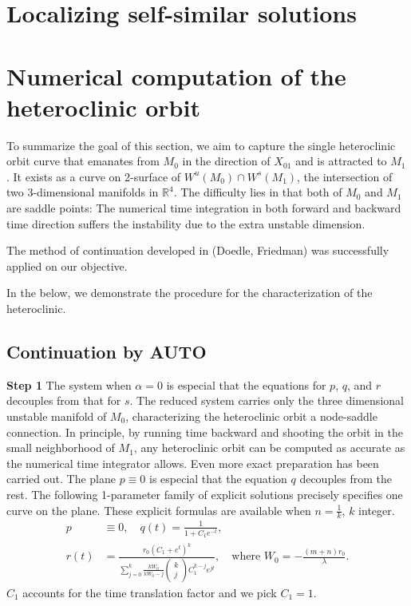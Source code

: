 \documentclass[a4paper,11pt]{article}
\def\blue{\color{blue}}
\theoremstyle{remark}
\begin{document}
\section{Localizing self-similar solutions}

\section{Numerical computation of the heteroclinic orbit}
To summarize the goal of this section, we aim to capture the single heteroclinic orbit curve that emanates from $M_0$ in the direction of $X_{01}$ and is attracted to $M_1$. It exists as a curve on 2-surface of $W^u(M_0)\cap W^s(M_1)$, the intersection of two 3-dimensional manifolds in $\mathbb{R}^4$. The difficulty lies in that both of $M_0$ and $M_1$ are saddle points: The numerical time integration in both forward and backward time direction suffers the instability due to the extra unstable dimension.

The method of continuation developed in {\blue (Doedle, Friedman)} was successfully applied on our objective.

In the below, we demonstrate the procedure for the characterization of the heteroclinic.
\subsection{Continuation by AUTO}
{\bf \noindent Step 1}
The system when $\alpha=0$ is especial that the equations for $p$, $q$, and $r$ decouples from that for $s$. The reduced system carries only the three dimensional unstable manifold of $M_0$, characterizing the heteroclinic orbit a node-saddle connection. In principle, by running time backward and shooting the orbit in the small neighborhood of $M_1$, any heteroclinic orbit can be computed as accurate as the numerical time integrator allows. Even more exact preparation has been carried out. The plane $p\equiv0$ is especial that the equation $q$ decouples from the rest. The following 1-parameter family of explicit solutions precisely specifies one curve on the plane. These explicit formulas are available when $n= \frac{1}{k}$, $k$ integer.
\begin{align}
 p&\equiv0, \quad q(t) = \frac{1}{1+C_1e^{-t}},\\
 r(t) &= \frac{r_0 \left(C_1 + e^t\right)^k}{ \displaystyle \sum_{j=0}^k \frac{kW_0}{kW_0 -j}\begin{pmatrix} k\\j\end{pmatrix}C_1^{k-j} e^{jt}} , \quad \text{where $W_0= - \frac{(m+n)r_0}{\lambda}$}.
\end{align}
$C_1$ accounts for the time translation factor and we pick $C_1=1$.
\end{document}
